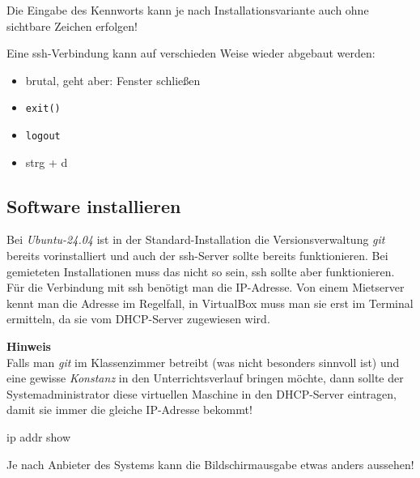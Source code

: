\documentclass[
  letterpaper,
  DIV=11]{scrreprt}
\newenvironment{Shaded}{\begin{snugshade}}{\end{snugshade}}
\newcommand{\ExtensionTok}[1]{\textcolor[rgb]{0.00,0.23,0.31}{#1}}
\newcommand{\NormalTok}[1]{\textcolor[rgb]{0.00,0.23,0.31}{#1}}
\newcommand{\git}{\textit{git}\xspace}
\newcommand{\strg}[1]{strg + #1\xspace}
\begin{document}
Die Eingabe des Kennworts kann je nach Installationsvariante auch ohne
sichtbare Zeichen erfolgen!

Eine ssh-Verbindung kann auf verschieden Weise wieder abgebaut werden:

\begin{itemize}
\item
  brutal, geht aber: Fenster schließen
\item
  \texttt{exit()}
\item
  \texttt{logout}
\item
  \strg{d}
\end{itemize}

\subsection{Software installieren}\label{software-installieren}

Bei \emph{Ubuntu-24.04} ist in der Standard-Installation die
Versionsverwaltung \git bereits vorinstalliert und auch der ssh-Server
sollte bereits funktionieren. Bei gemieteten Installationen muss das
nicht so sein, ssh sollte aber funktionieren. Für die Verbindung mit ssh
benötigt man die IP-Adresse. Von einem Mietserver kennt man die Adresse
im Regelfall, in VirtualBox muss man sie erst im Terminal ermitteln, da
sie vom DHCP-Server zugewiesen wird.

\samplestart

\textbf{Hinweis}\\
Falls man \git im Klassenzimmer betreibt (was nicht besonders sinnvoll
ist) und eine gewisse \emph{Konstanz} in den Unterrichtsverlauf bringen
möchte, dann sollte der Systemadministrator diese virtuellen Maschine in
den DHCP-Server eintragen, damit sie immer die gleiche IP-Adresse
bekommt! \sampleend

\begin{Shaded}
\begin{Highlighting}[]
\ExtensionTok{ip}\NormalTok{ addr show}
\end{Highlighting}
\end{Shaded}

Je nach Anbieter des Systems kann die Bildschirmausgabe etwas anders
aussehen!
\end{document}
